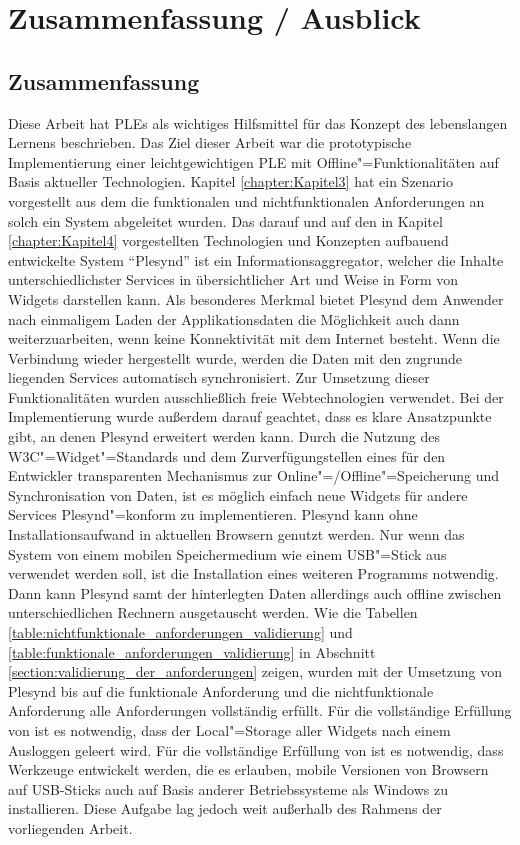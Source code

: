 \chapter{Zusammenfassung / Ausblick}\label{chapter:Kapitel7}

\section{Zusammenfassung}
Diese Arbeit hat \acp{PLE} als wichtiges Hilfsmittel für das Konzept des lebenslangen Lernens beschrieben. Das Ziel dieser Arbeit war die prototypische Implementierung einer leichtgewichtigen \ac{PLE} mit Offline"=Funktionalitäten auf Basis aktueller Technologien. Kapitel \ref{chapter:Kapitel3} hat ein Szenario vorgestellt aus dem die funktionalen und nichtfunktionalen Anforderungen an solch ein System abgeleitet wurden. Das darauf und auf den in Kapitel \ref{chapter:Kapitel4} vorgestellten Technologien und Konzepten aufbauend entwickelte System "`Plesynd"' ist ein Informationsaggregator, welcher die Inhalte unterschiedlichster Services in übersichtlicher Art und Weise in Form von Widgets darstellen kann. Als besonderes Merkmal bietet Plesynd dem Anwender nach einmaligem Laden der Applikationsdaten die Möglichkeit auch dann weiterzuarbeiten, wenn keine Konnektivität mit dem Internet besteht. Wenn die Verbindung wieder hergestellt wurde, werden die Daten mit den zugrunde liegenden Services automatisch synchronisiert. Zur Umsetzung dieser Funktionalitäten wurden ausschließlich freie Webtechnologien verwendet. Bei der Implementierung wurde außerdem darauf geachtet, dass es klare Ansatzpunkte gibt, an denen Plesynd erweitert werden kann. Durch die Nutzung des \ac{W3C}"=Widget"=Standards und dem Zurverfügungstellen eines für den Entwickler transparenten Mechanismus zur Online"=/Offline"=Speicherung und Synchronisation von Daten, ist es möglich einfach neue Widgets für andere Services Plesynd"=konform zu implementieren. Plesynd kann ohne Installationsaufwand in aktuellen Browsern genutzt werden. Nur wenn das System von einem mobilen Speichermedium wie einem USB"=Stick aus verwendet werden soll, ist die Installation eines weiteren Programms notwendig. Dann kann Plesynd samt der hinterlegten Daten allerdings auch offline zwischen unterschiedlichen Rechnern ausgetauscht werden.  Wie die Tabellen \ref{table:nichtfunktionale_anforderungen_validierung} und \ref{table:funktionale_anforderungen_validierung} in Abschnitt \ref{section:validierung_der_anforderungen} zeigen, wurden mit der Umsetzung von Plesynd bis auf die funktionale Anforderung  und die nichtfunktionale Anforderung  alle Anforderungen vollständig erfüllt. Für die vollständige Erfüllung von  ist es notwendig, dass der Local"=Storage aller Widgets nach einem Ausloggen geleert wird. Für die vollständige Erfüllung von  ist es notwendig, dass Werkzeuge entwickelt werden, die es erlauben, mobile Versionen von Browsern auf USB-Sticks auch auf Basis anderer Betriebssysteme als Windows zu installieren. Diese Aufgabe lag jedoch weit außerhalb des Rahmens der vorliegenden Arbeit.

